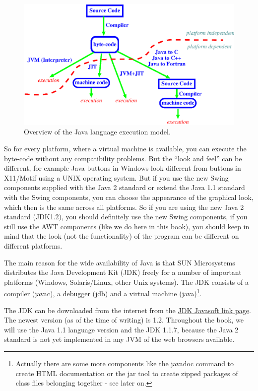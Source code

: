 \begin{figure}[htbp]
  \begin{center}
    \leavevmode
    \includegraphics{Figures/Java_Overview.eps}
    \caption{Overview of the Java language execution model.}
    \label{fig:Java_Overview}
  \end{center}
\end{figure}

So for every platform, where a virtual machine is available,
you can execute the byte-code without any compatibility problems.
But the ``look and feel'' can be different, for example Java buttons
in Windows look different from buttons in X11/Motif using a UNIX
operating system. But if you use the new Swing components supplied
with the Java 2 standard or extend the Java 1.1 standard with the Swing
components, you can choose the appearance of the graphical look, which then
is the same across all platforms. So if you are using the new Java 2 standard
(JDK1.2), you should definitely use the new Swing components, if you
still use the AWT components (like we do here in this book), you should
keep in mind that the look (not the functionality) 
of the program can be different on different platforms. 

The main reason for the wide availability of Java
is that SUN Microsystems distributes the Java Development Kit (JDK)
freely for a number of important platforms (Windows, Solaris/Linux,
other Unix systems). The JDK consists of a compiler (javac), a
debugger (jdb) and a virtual machine (java)\footnote{Actually there
are some more components like the javadoc command to create HTML
documentation or the jar tool to create zipped packages of
class files belonging together - see later on.}.

The JDK can be downloaded from the internet from the 
\href{http://www.javasoft.com}{JDK Javasoft link page}.
The newest version (as of the time of writing) is 1.2. 
Throughout the book,
we will use the Java 1.1 language version and the JDK 1.1.7,
because the Java 2 standard is not yet implemented in any JVM of the
web browsers available.

